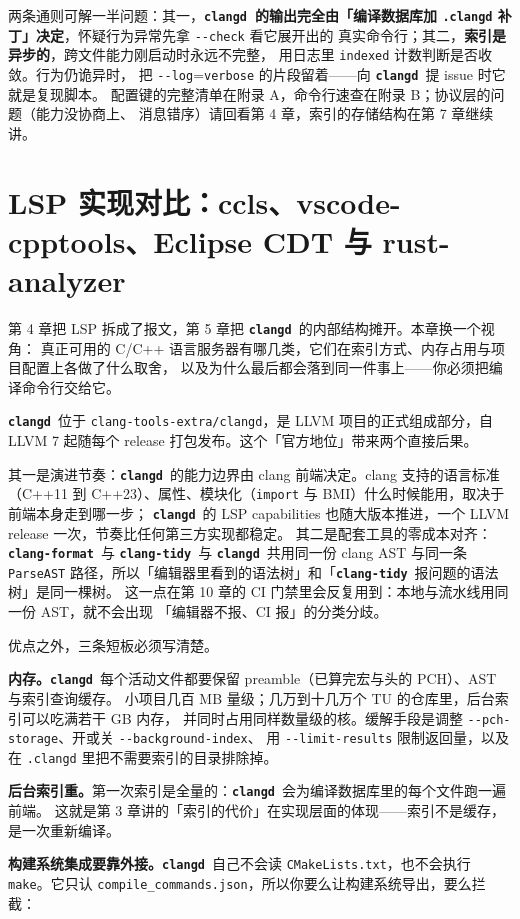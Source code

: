 \documentclass[12pt,a4paper,fontset=fandol]{ctexbook}
\newcommand{\cpp}[1]{C++#1}
\newcommand{\Opt}[1]{\texttt{-\/-#1}}
\newcommand{\Lib}[1]{\textbf{\texttt{#1}}}
\newcommand{\Tidy}{\Lib{clang-tidy}}
\newcommand{\Fmt}{\Lib{clang-format}}
\newcommand{\CD}{\Lib{clangd}}
\begin{document}
两条通则可解一半问题：其一，\textbf{\CD\ 的输出完全由「编译数据库加
\texttt{.clangd} 补丁」决定}，怀疑行为异常先拿 \Opt{check} 看它展开出的
真实命令行；其二，\textbf{索引是异步的}，跨文件能力刚启动时永远不完整，
用日志里 \texttt{indexed} 计数判断是否收敛。行为仍诡异时，
把 \Opt{log}=\texttt{verbose} 的片段留着——向 \CD\ 提 issue 时它就是复现脚本。
配置键的完整清单在附录 A，命令行速查在附录 B；协议层的问题（能力没协商上、
消息错序）请回看第 4 章，索引的存储结构在第 7 章继续讲。

\chapter{LSP 实现对比：ccls、vscode-cpptools、Eclipse CDT 与 rust-analyzer}\label{ch:lsp-implementations}

第 4 章把 LSP 拆成了报文，第 5 章把 \CD\ 的内部结构摊开。本章换一个视角：
真正可用的 C/C++ 语言服务器有哪几类，它们在索引方式、内存占用与项目配置上各做了什么取舍，
以及为什么最后都会落到同一件事上——你必须把编译命令行交给它。

\CD\ 位于 \texttt{clang-tools-extra/clangd}，是 LLVM 项目的正式组成部分，自 LLVM 7 起随每个
release 打包发布。这个「官方地位」带来两个直接后果。

其一是演进节奏：\CD\ 的能力边界由 clang 前端决定。clang 支持的语言标准（\cpp{11} 到
\cpp{23}）、属性、模块化（\texttt{import} 与 BMI）什么时候能用，取决于前端本身走到哪一步；
\CD\ 的 LSP capabilities 也随大版本推进，一个 LLVM release 一次，节奏比任何第三方实现都稳定。
其二是配套工具的零成本对齐：\Fmt\ 与 \Tidy\ 与 \CD\ 共用同一份 clang AST 与同一条
\texttt{ParseAST} 路径，所以「编辑器里看到的语法树」和「\Tidy\ 报问题的语法树」是同一棵树。
这一点在第 10 章的 CI 门禁里会反复用到：本地与流水线用同一份 AST，就不会出现
「编辑器不报、CI 报」的分类分歧。

优点之外，三条短板必须写清楚。

\textbf{内存。}\CD\ 每个活动文件都要保留 preamble（已算完宏与头的 PCH）、AST 与索引查询缓存。
小项目几百 MB 量级；几万到十几万个 TU 的仓库里，后台索引可以吃满若干 GB 内存，
并同时占用同样数量级的核。缓解手段是调整 \Opt{pch-storage}、开或关 \Opt{background-index}、
用 \Opt{limit-results} 限制返回量，以及在 \texttt{.clangd} 里把不需要索引的目录排除掉。

\textbf{后台索引重。}第一次索引是全量的：\CD\ 会为编译数据库里的每个文件跑一遍前端。
这就是第 3 章讲的「索引的代价」在实现层面的体现——索引不是缓存，是一次重新编译。

\textbf{构建系统集成要靠外接。}\CD\ 自己不会读 \texttt{CMakeLists.txt}，也不会执行
\texttt{make}。它只认 \texttt{compile\_commands.json}，所以你要么让构建系统导出，要么拦截：
\end{document}
